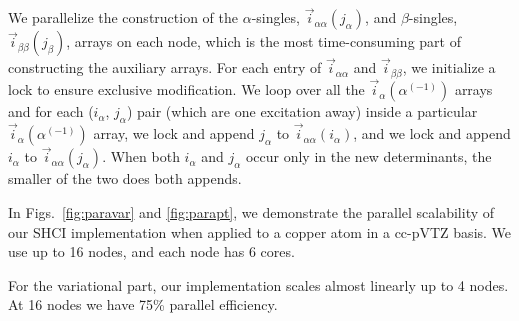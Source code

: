 \documentclass[%
reprint,
 superscriptaddress,
 amsmath,amssymb,
 aps,
]{revtex4-1}
\def\ia{i_\alpha}
\def\ja{j_\alpha}
\def\vecia{\vec{i}_\alpha}
\def\veciaa{\vec{i}_{\alpha\alpha}}
\def\vecibb{\vec{i}_{\beta\beta}}
\begin{document}

We parallelize the construction of the $\alpha$-singles, $\veciaa(j_\alpha)$, and $\beta$-singles, $\vecibb(j_\beta)$,
arrays on each node, which is the most time-consuming part of constructing the auxiliary arrays.
For each entry of $\veciaa$ and $\vecibb$, we initialize a lock to ensure exclusive modification.
We loop over all the $\vecia({\alpha^{(-1)}})$ arrays and for each ($\ia$, $\ja$) pair (which are one excitation away) inside a particular $\vecia({\alpha^{(-1)}})$ array,
we lock and append $\ja$ to $\veciaa{(\ia)}$, and
we lock and append $\ia$ to $\veciaa{(\ja)}$.
When both $\ia$ and $\ja$ occur only in the new determinants, the smaller of the two does both appends.

In Figs.~\ref{fig:paravar} and \ref{fig:parapt}, we demonstrate the parallel scalability of our SHCI implementation
when applied to a copper atom in a cc-pVTZ basis. We use up to 16 nodes, and each node has 6 cores.

For the variational part, our implementation scales almost linearly up to 4 nodes.
At 16 nodes we have 75\% parallel efficiency.
\end{document}
